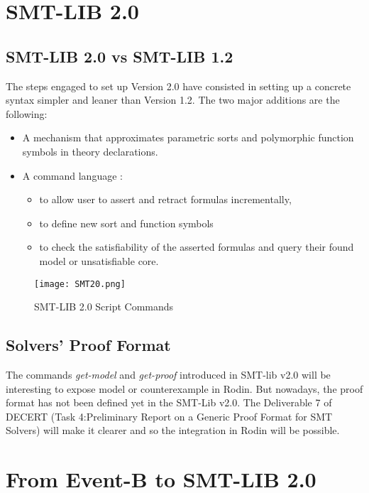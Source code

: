 \section{SMT-LIB 2.0}
\subsection{SMT-LIB 2.0 vs SMT-LIB 1.2}
The steps engaged to set up Version 2.0 have consisted in setting up a concrete syntax simpler and leaner than Version 1.2.
The two major additions are the following:
\begin{itemize}
\item A mechanism that approximates parametric sorts and polymorphic function symbols in theory declarations.
\item A command language :
\begin{itemize}
\item to allow user to assert and retract formulas incrementally,
\item to define new sort and function symbols
\item to check the satisfiability of the asserted formulas and query their found model or unsatisfiable core.
\end{itemize}
\end{itemize}


\begin{figure}
\centering
\texttt{[image: SMT20.png]}
\caption{SMT-LIB 2.0 Script Commands} 
\label{Fig:SMT-LIB 2.0}
\end{figure}

\subsection{Solvers' Proof Format}
The commands \textit{get-model} and \textit{get-proof} introduced in SMT-lib v2.0 will be interesting to expose model or counterexample in Rodin. But nowadays, the proof format has not been defined yet in the SMT-Lib v2.0. The Deliverable 7 of DECERT (Task 4:Preliminary Report on a Generic Proof Format for SMT Solvers) will make it clearer and so the integration in Rodin will be possible. 
 
\section{From Event-B to SMT-LIB 2.0}

